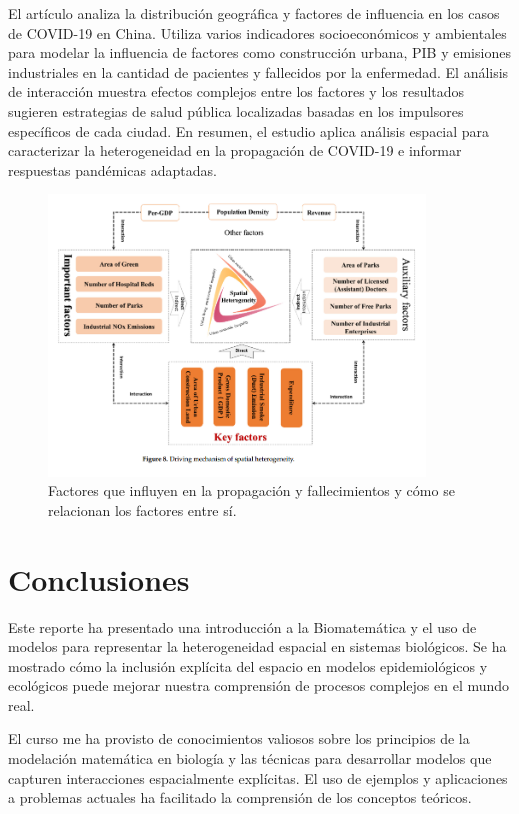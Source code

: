 \documentclass[fleqn,10pt]{SelfArx_063318} %
\begin{document}
El artículo \cite{li2022geographical} analiza la distribución geográfica y factores de influencia en los casos de
COVID-19 en China. Utiliza varios indicadores socioeconómicos y ambientales para modelar la
influencia de factores como construcción urbana, PIB y emisiones industriales en la cantidad de pacientes y fallecidos
por la enfermedad. El análisis de interacción muestra efectos complejos entre los factores y los resultados sugieren
estrategias de salud pública localizadas basadas en los impulsores específicos de cada ciudad.
En resumen, el estudio aplica análisis espacial para caracterizar la heterogeneidad en la propagación de COVID-19 e
informar respuestas pandémicas adaptadas.

\begin{figure}[h!]
	\centering
		\includegraphics[width=10cm]{images/spatial-heterogenity-factos-weiwei.png}%
		\caption{Factores que influyen en la propagación y fallecimientos y cómo se relacionan los factores entre sí.}
\end{figure}

\section{Conclusiones}

Este reporte ha presentado una introducción a la Biomatemática y el uso de modelos para representar la
heterogeneidad espacial en sistemas biológicos. Se ha mostrado cómo la inclusión explícita del espacio en
modelos epidemiológicos y ecológicos puede mejorar nuestra comprensión de procesos complejos en el mundo real.

El curso me ha provisto de conocimientos valiosos sobre los principios de la modelación matemática en biología
y las técnicas para desarrollar modelos que capturen interacciones espacialmente explícitas. El uso de ejemplos
y aplicaciones a problemas actuales ha facilitado la comprensión de los conceptos teóricos.
\end{document}
